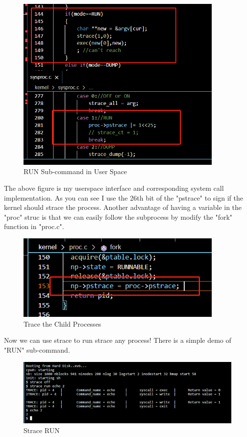 \documentclass[11pt,oneside,a4paper]{article}
\begin{document}
\begin{figure}[H]
    \includegraphics[width=4.00in]{1-16.png}
    \centering
    \caption{RUN Sub-command in User Space}
\end{figure}

The above figure is my userspace interface and corresponding system call implementation.
As you can see I use the 26th bit of the "pstrace" to sign if the kernel should strace
the process. Another advantage of having a variable in the "proc" struc is that we can 
easily follow the subprocess by modify the "fork" function in "proc.c".

\begin{figure}[H]
    \includegraphics[width=4.00in]{1-17.png}
    \centering
    \caption{Trace the Child Processes}
\end{figure}

Now we can use strace to run strace any process! There is a simple demo of "RUN" 
sub-command.

\begin{figure}[H]
    \includegraphics[width=4.75in]{1-18.png}
    \centering
    \caption{Strace RUN}
\end{figure}
\end{document}
